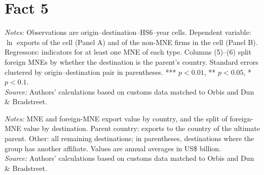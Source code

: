 \documentclass[11pt,a4paper]{article}
\begin{document}
\section*{Fact 5}%
\begin{table}[H]\centering\small%
  \caption{Multinational Presence and Exports: Extensive Margin, by Type of Multinational}%
  \label{tab:a_ext}%
  \par\vspace{3pt}%
  \begin{minipage}{0.95\textwidth}\footnotesize %
  \textit{Notes:} Observations are origin--destination--HS6--year cells. Dependent variable: $\ln$ exports of the cell (Panel A) and of the non-MNE firms in the cell (Panel B). Regressors: indicators for at least one MNE of each type. Columns (5)--(6) split foreign MNEs by whether the destination is the parent's country. Standard errors clustered by origin--destination pair in parentheses. *** $p<0.01$, ** $p<0.05$, * $p<0.1$.\\[3pt]%
  \textit{Source:} Authors' calculations based on customs data matched to Orbis and Dun \& Bradstreet.%
  \end{minipage}%
  \end{table}
\begin{table}[H]\centering\small%
  \caption{Multinational Exports by Exporting Country and Destination Type}%
  \label{tab:a_pres}%
  \par\vspace{3pt}%
  \begin{minipage}{0.95\textwidth}\footnotesize %
  \textit{Notes:} MNE and foreign-MNE export value by country, and the split of foreign-MNE value by destination. Parent country: exports to the country of the ultimate parent. Other: all remaining destinations; in parentheses, destinations where the group has another affiliate. Values are annual averages in US\$ billion.\\[3pt]%
  \textit{Source:} Authors' calculations based on customs data matched to Orbis and Dun \& Bradstreet.%
  \end{minipage}%
  \end{table}
\end{document}
